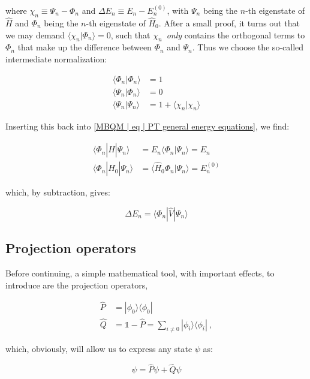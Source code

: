 \documentclass[10pt]{report}
\begin{document}
	where $\chi_n \equiv \Psi_n-\Phi_n$ and $\Delta E_n \equiv E_n - E_n^{(0)}$, with $\Psi_n$ being the $n$-th eigenstate of $\hat{H}$ and $\Phi_n$ being the $n$-th eigenstate of $\hat{H}_0$. After a small proof, it turns out that we may demand $\langle\chi_n|\Phi_n\rangle = 0$, such that $\chi_n$ \emph{only} contains the orthogonal terms to $\Phi_n$ that make up the difference between $\Phi_n$ and $\Psi_n$. Thus we choose the so-called intermediate normalization:
	
	\begin{align}
		\langle\Phi_n|\Phi_n\rangle &= 1 \\
		\langle\Psi_n|\Phi_n\rangle &= 0 \\ 
		\langle\Psi_n|\Psi_n\rangle &= 1 + \langle\chi_n|\chi_n\rangle
	\end{align}
	
	Inserting this back into \ref{MBQM | eq | PT general energy equations}, we find:
	
	\begin{align}
		\langle\Phi_n|\hat{H}|\Psi_n\rangle &= E_n\langle\Phi_n|\Psi_n\rangle = E_n \\
		\langle\Phi_n|\hat{H}_0|\Psi_n\rangle &= \langle\hat{H}_0\Phi_n|\Psi_n\rangle = E_n^{(0)}
	\end{align}
	
	which, by subtraction, gives:
	
	\begin{equation}
	\Delta E_n = \langle\Phi_n|\hat{V}|\Psi_n\rangle
	\end{equation}
	
	\subsection{Projection operators}
	Before continuing, a simple mathematical tool, with important effects, to introduce are the projection operators,
	
	\begin{align}
		\hat{P} &= |\phi_0\rangle\langle\phi_0| \\
		\hat{Q} &= \mathds{1} - \hat{P} = \sum_{i\neq 0} |\phi_i\rangle\langle\phi_i|\:,
	\end{align}
	
	which, obviously, will allow us to express any state $\psi$ as:
	
	\begin{equation}
		\psi = \hat{P}\psi + \hat{Q}\psi
	\end{equation}
	
\end{document}
